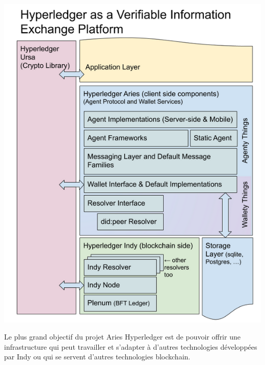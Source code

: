 \documentclass[12pt, openany]{report}
\begin{document}
\begin{flushleft}
\begin{itemize}
\end{itemize}
\begin{center}
\includegraphics[scale=0.4]{aries-hyper.png}
\end{center}

\vspace{5mm}
Le plus grand objectif du projet Aries Hyperledger est de pouvoir offrir une infrastructure qui peut travailler et s'adapter à d'autres technologies développées par Indy ou qui se servent d'autres technologies blockchain. 
\end{flushleft}

\newpage
\end{document}

